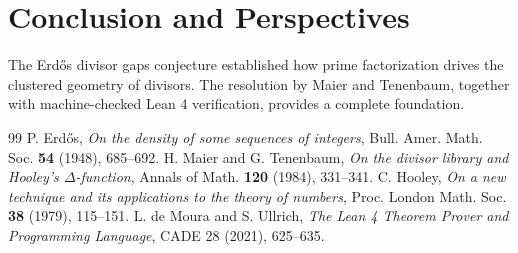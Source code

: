 \documentclass[11pt,a4paper]{article}
\theoremstyle{definition}
\begin{document}
\section{Conclusion and Perspectives}
The Erd\H{o}s divisor gaps conjecture established how prime factorization drives the clustered geometry of divisors. The resolution by Maier and Tenenbaum, together with machine-checked Lean 4 verification, provides a complete foundation.

\begin{thebibliography}{99}
 P. Erd\H{o}s, \textit{On the density of some sequences of integers}, Bull. Amer. Math. Soc. \textbf{54} (1948), 685--692.
 H. Maier and G. Tenenbaum, \textit{On the divisor library and Hooley's $\Delta$-function}, Annals of Math. \textbf{120} (1984), 331--341.
 C. Hooley, \textit{On a new technique and its applications to the theory of numbers}, Proc. London Math. Soc. \textbf{38} (1979), 115--151.
 L. de Moura and S. Ullrich, \textit{The Lean 4 Theorem Prover and Programming Language}, CADE 28 (2021), 625--635.
\end{thebibliography}
\end{document}

